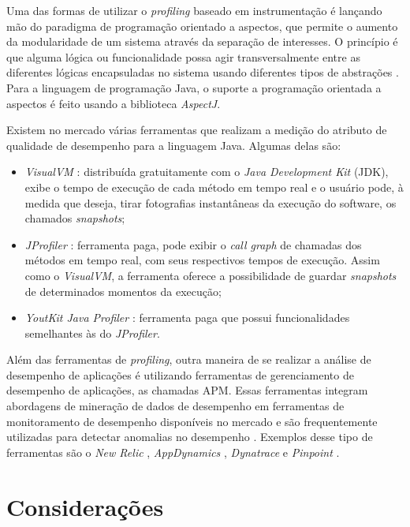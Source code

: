 Uma das formas de utilizar o \textit{profiling} baseado em instrumentação é lançando mão do paradigma de programação orientado a aspectos, que permite o aumento da modularidade de um sistema através da separação de interesses. O princípio é que alguma lógica ou funcionalidade possa agir transversalmente entre as diferentes lógicas encapsuladas no sistema usando diferentes tipos de abstrações \cite{Bateman2009}. Para a linguagem de programação Java, o suporte a programação orientada a aspectos é feito usando a biblioteca \textit{AspectJ}.

Existem no mercado várias ferramentas que realizam a medição do atributo de qualidade de desempenho para a linguagem Java. Algumas delas são:
\begin{itemize}
	\item \textit{VisualVM} \cite{Vis}: distribuída gratuitamente com o \textit{Java Development Kit} (JDK), exibe o tempo de execução de cada método em tempo real e o usuário pode, à medida que deseja, tirar fotografias instantâneas da execução do software, os chamados \textit{snapshots};
	\item \textit{JProfiler} \cite{JProfiler}: ferramenta paga, pode exibir o \textit{call graph} de chamadas dos métodos em tempo real, com seus respectivos tempos de execução. Assim como o \textit{VisualVM}, a ferramenta oferece a possibilidade de guardar \textit{snapshots} de determinados momentos da execução;
	\item \textit{YoutKit Java Profiler} \cite{Profiler2016}: ferramenta paga que possui funcionalidades semelhantes às do \textit{JProfiler}.
\end{itemize}

Além das ferramentas de \textit{profiling}, outra maneira de se realizar a análise de desempenho de aplicações é utilizando ferramentas de gerenciamento de desempenho de aplicações, as chamadas APM. Essas ferramentas integram abordagens de mineração de dados de desempenho em ferramentas de monitoramento de desempenho disponíveis no mercado e são frequentemente utilizadas para detectar anomalias no desempenho \cite{Ahmed2016}. Exemplos desse tipo de ferramentas são o \textit{New Relic} \cite{Relic2016}, \textit{AppDynamics} \cite{Appdynamics}, \textit{Dynatrace} \cite{Dynatrace2016} e \textit{Pinpoint} \cite{Pinpoint2016}.

\section{Considerações} \label{sec:consideracoes-cap2}

